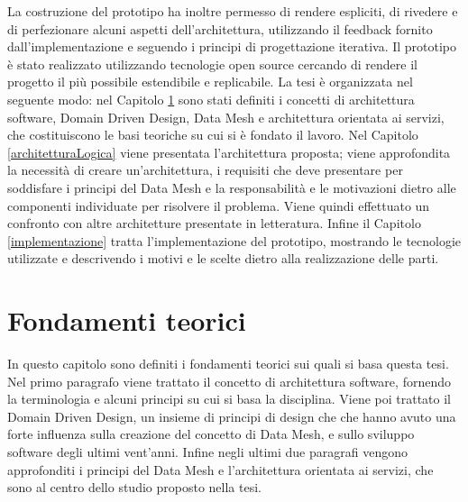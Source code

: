 \documentclass[a4paper,12pt]{report}
\begin{document}
La costruzione del prototipo ha inoltre permesso di rendere espliciti, di rivedere e di perfezionare alcuni aspetti dell'architettura, utilizzando il feedback fornito dall'implementazione e seguendo i principi di progettazione iterativa.
Il prototipo è stato realizzato utilizzando tecnologie open source cercando di rendere il progetto il più possibile estendibile e replicabile.
La tesi è organizzata nel seguente modo: nel Capitolo \ref{fondamenti teorici} sono stati definiti i concetti di architettura software, Domain Driven Design, Data Mesh e architettura orientata ai servizi, che costituiscono le basi teoriche su cui si è fondato il lavoro.
Nel Capitolo \ref{architetturaLogica} viene presentata l'architettura proposta; viene approfondita la necessità di creare un'architettura, i requisiti che deve presentare per soddisfare i principi del Data Mesh e la responsabilità e le motivazioni dietro alle componenti individuate per risolvere il problema.
Viene quindi effettuato un confronto con altre architetture presentate in letteratura.
Infine il Capitolo \ref{implementazione} tratta l'implementazione del prototipo,  mostrando le tecnologie utilizzate e descrivendo i motivi e le scelte dietro alla realizzazione delle parti.

\chapter{Fondamenti teorici}\label{fondamenti teorici}
In questo capitolo sono definiti i fondamenti teorici sui quali si basa questa tesi.
Nel primo paragrafo viene trattato il concetto di architettura software, fornendo la terminologia e alcuni principi su cui si basa la disciplina.
Viene poi trattato il Domain Driven Design, un insieme di principi di design che che hanno avuto una forte influenza sulla creazione del concetto di Data Mesh, e sullo sviluppo software degli ultimi vent'anni.
Infine negli ultimi due paragrafi vengono approfonditi i principi del Data Mesh e l'architettura orientata ai servizi, che sono al centro dello studio proposto nella tesi.
\end{document}
